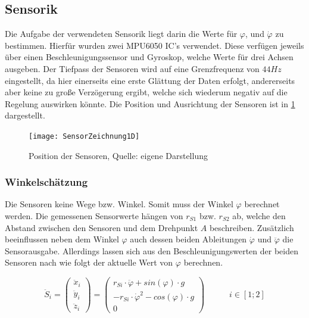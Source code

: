 \subsection{Sensorik}
\label{Sensorik_sec}
Die Aufgabe der verwendeten Sensorik liegt darin die Werte für $\varphi$, und $\dot{\varphi}$ zu bestimmen. Hierfür wurden zwei MPU6050 IC's verwendet. Diese verfügen jeweils über einen Beschleunigungssensor und Gyroskop, welche Werte für drei Achsen ausgeben. Der Tiefpass der Sensoren wird auf eine Grenzfrequenz von $44Hz$ eingestellt, da hier einerseits eine erste Glättung der Daten erfolgt, andererseits aber keine zu große Verzögerung ergibt, welche sich wiederum negativ auf die Regelung auswirken könnte. Die Position und Ausrichtung der Sensoren ist in \ref{Position_Sensoren_pic} dargestellt.

\begin{figure}[h]
\texttt{[image: SensorZeichnung1D]}
\caption{Position der Sensoren, Quelle: eigene Darstellung}

\label{Position_Sensoren_pic}
\end{figure}

\subsubsection{Winkelschätzung}
Die Sensoren keine Wege bzw. Winkel. Somit muss der Winkel $\varphi$ berechnet werden. Die gemessenen Sensorwerte hängen von $r_{S1}$ bzw. $r_{S2}$ ab, welche den Abstand zwischen den Sensoren und dem Drehpunkt $A$ beschreiben. Zusätzlich beeinflussen neben dem Winkel $\varphi$ auch dessen beiden Ableitungen $\dot{\varphi}$ und $\ddot{\varphi}$ die Sensorausgabe. Allerdings lassen sich aus den Beschleunigungswerten der beiden Sensoren nach \cite{Cubli1D} wie folgt der aktuelle Wert von $\varphi$ berechnen.

\begin{equation}
\ddot{S}_i = 
\begin{pmatrix}
\ddot{x}_i \\ \ddot{y}_i \\ \ddot{z}_i
\end{pmatrix} =
\begin{pmatrix}
r_{Si} \cdot \ddot{\varphi} + sin(\varphi) \cdot g \\
- r_{Si} \cdot \dot{\varphi}^2 - cos(\varphi) \cdot g \\
0
\end{pmatrix}
\hspace{35pt}
i \in [1;2]
\end{equation}

